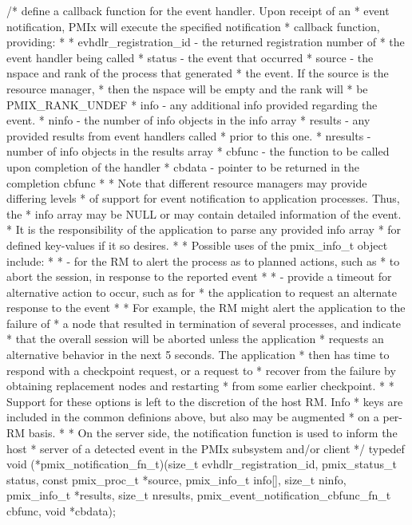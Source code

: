 \cspecificstart
\begin{codepar}
/* define a callback function for the event handler. Upon receipt of an
 * event notification, PMIx will execute the specified notification
 * callback function, providing:
 *
 * evhdlr_registration_id - the returned registration number of
 *                          the event handler being called
 * status - the event that occurred
 * source - the nspace and rank of the process that generated
 *          the event. If the source is the resource manager,
 *          then the nspace will be empty and the rank will
 *          be PMIX_RANK_UNDEF
 * info - any additional info provided regarding the event.
 * ninfo - the number of info objects in the info array
 * results - any provided results from event handlers called
 *           prior to this one.
 * nresults - number of info objects in the results array
 * cbfunc - the function to be called upon completion of the handler
 * cbdata - pointer to be returned in the completion cbfunc
 *
 * Note that different resource managers may provide differing levels
 * of support for event notification to application processes. Thus, the
 * info array may be NULL or may contain detailed information of the event.
 * It is the responsibility of the application to parse any provided info array
 * for defined key-values if it so desires.
 *
 * Possible uses of the pmix_info_t object include:
 *
 * - for the RM to alert the process as to planned actions, such as
 *   to abort the session, in response to the reported event
 *
 * - provide a timeout for alternative action to occur, such as for
 *   the application to request an alternate response to the event
 *
 * For example, the RM might alert the application to the failure of
 * a node that resulted in termination of several processes, and indicate
 * that the overall session will be aborted unless the application
 * requests an alternative behavior in the next 5 seconds. The application
 * then has time to respond with a checkpoint request, or a request to
 * recover from the failure by obtaining replacement nodes and restarting
 * from some earlier checkpoint.
 *
 * Support for these options is left to the discretion of the host RM. Info
 * keys are included in the common definions above, but also may be augmented
 * on a per-RM basis.
 *
 * On the server side, the notification function is used to inform the host
 * server of a detected event in the PMIx subsystem and/or client
 */
typedef void (*pmix_notification_fn_t)(size_t evhdlr_registration_id,
                                       pmix_status_t status,
                                       const pmix_proc_t *source,
                                       pmix_info_t info[], size_t ninfo,
                                       pmix_info_t *results, size_t nresults,
                                       pmix_event_notification_cbfunc_fn_t cbfunc,
                                       void *cbdata);
\end{codepar}
\cspecificend

